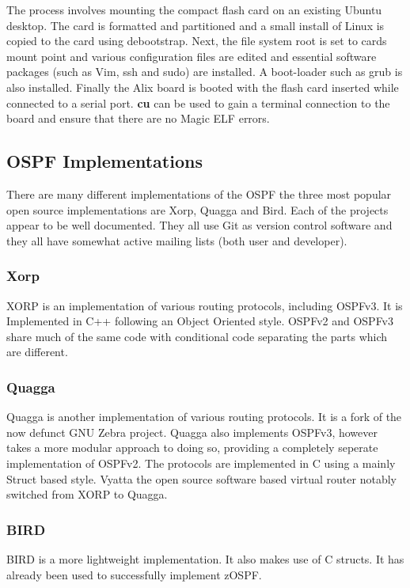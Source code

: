 \documentclass[12pt]{report}
\begin{document}
The process involves mounting the compact flash card on an existing Ubuntu
desktop.  The card is formatted and partitioned and a small install of Linux is
copied to the card using debootstrap.  Next, the file system root is set to
cards mount point and various configuration files are edited and essential
software packages (such as Vim, ssh and sudo) are installed. A boot-loader such
as grub is also installed.  Finally the Alix board is booted with the flash card
inserted while connected to a serial port.  {\bf cu} can be used to gain a
terminal connection to the board and ensure that there are no Magic ELF errors.

\subsection{OSPF Implementations}
There are many different implementations of the OSPF the three most popular open
source implementations are Xorp, Quagga and Bird. Each of the projects appear to 
be well documented. They all use Git as version control software and they all 
have somewhat active mailing lists (both user and developer).

\subsubsection{Xorp}
XORP is an implementation of various routing protocols, including
OSPFv3. It is Implemented in C++ following an Object Oriented style.
OSPFv2 and OSPFv3 share much of the same code with conditional code
separating the parts which are different.

\subsubsection{Quagga}


Quagga is another implementation of various routing protocols.  It is a
fork of the now defunct GNU Zebra project.  Quagga also implements
OSPFv3, however takes a more modular approach to doing so, providing a
completely seperate implementation of OSPFv2. The protocols are
implemented in C using a mainly Struct based style.  Vyatta the open
source software based virtual router notably switched from XORP to
Quagga. 

\subsubsection{BIRD}
BIRD is a more lightweight implementation. It also makes use of C
structs. It has already been used to successfully implement zOSPF.
\end{document}
